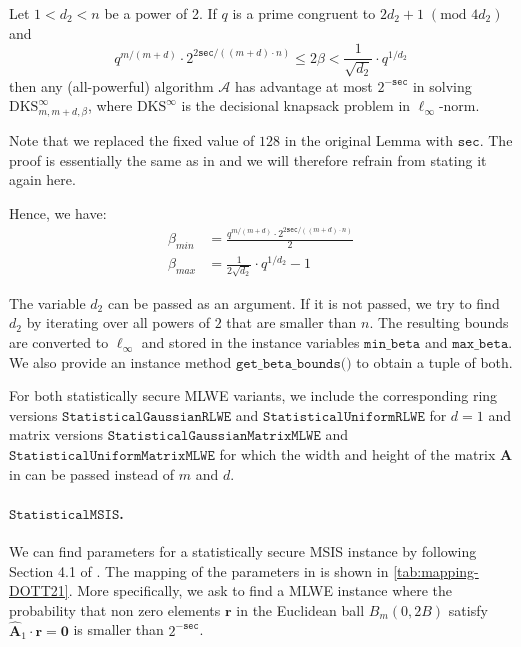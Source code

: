 \begin{theorem}
    Let $1 < d_2 < n$ be a power of 2. If $q$ is a prime congruent to $2d_2 + 1 \;(\text{mod } 4d_2)$ and
    \begin{equation}
        q^{m/(m+d)} \cdot 2^{2 \texttt{sec}/((m+d)\cdot n)} \leq 2 \beta < \frac{1}{\sqrt{d_2}} \cdot q^{1/d_2}
    \end{equation}
    then any (all-powerful) algorithm $\mathcal{A}$ has advantage at most $2^{-\texttt{sec}}$ in solving $\text{DKS}_{m,m+d,\beta}^\infty$, where $\text{DKS}^\infty$ is the decisional knapsack problem in $\ell_\infty$-norm.
\end{theorem}
Note that we replaced the fixed value of $128$ in the original Lemma with $\texttt{sec}$. The proof is essentially the same as in \cite{BDLOP18} and we will therefore refrain from stating it again here.


Hence, we have:
\begin{align}
    \beta_{min} & = \frac{q^{m/(m+d)} \cdot 2^{2 \texttt{sec}/((m+d)\cdot n)}}{2} \\
    \beta_{max} & = \frac{1}{2\sqrt{d_2}} \cdot q^{1/d_2} - 1
\end{align}

The variable $d_2$ can be passed as an argument. If it is not passed, we try to find $d_2$ by iterating over all powers of $2$ that are smaller than $n$.
The resulting bounds are converted to $\ell_\infty$ and stored in the instance variables $\texttt{min\_beta}$ and $\texttt{max\_beta}$. We also provide an instance method $\texttt{get\_beta\_bounds()}$ to obtain a tuple of both.

For both statistically secure MLWE variants, we include the corresponding ring versions $\texttt{StatisticalGaussianRLWE}$ and $\texttt{StatisticalUniformRLWE}$ for $d=1$ and matrix versions $\texttt{StatisticalGaussianMatrixMLWE}$ and $\texttt{StatisticalUniformMatrixMLWE}$ for which the width and height of the matrix $\mathbf{A}$ in \cite{LPR13} can be passed instead of $m$ and $d$. %


\paragraph{$\texttt{StatisticalMSIS}$.} We can find parameters for a statistically secure MSIS instance by following Section 4.1 of \cite{DOTT21}. The mapping of the parameters in \cite{DOTT21} is shown in \cref{tab:mapping-DOTT21}. More specifically, we ask to find a MLWE instance where the probability that non zero elements $\mathbf{r}$ in the Euclidean ball $B_{m}(0, 2B)$ satisfy $\hat{\mathbf{A}}_1 \cdot \mathbf{r} = \mathbf{0}$ is smaller than $2^{-\texttt{sec}}$. %

